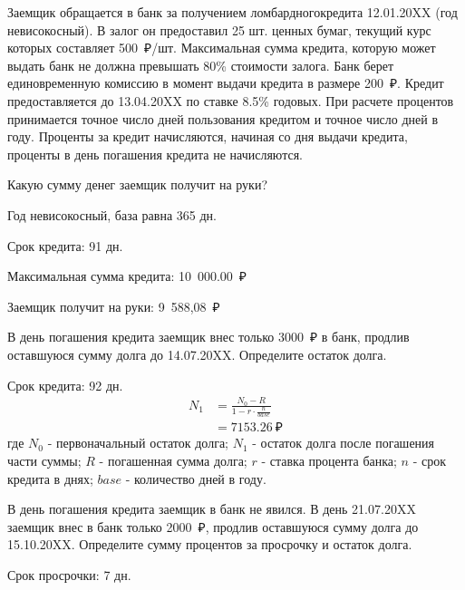 \documentclass[12pt, table]{exam}
\begin{document}
\begin{questions}
\begin{subparts}
\begin{solution}[12em]
	\end{solution}
	
\end{subparts}
\addpoints

\pagebreak
\question[15] Заемщик обращается в банк за получением ломбардного\linebreak кредита 12.01.20XX (год невисокосный). В залог он предоставил 25 шт. ценных бумаг, текущий курс которых составляет 500~₽/шт. Максимальная сумма кредита, которую может выдать банк не должна превышать 80\% стоимости залога. Банк берет единовременную комиссию в момент выдачи кредита в размере 200~₽. Кредит предоставляется до 13.04.20XX по ставке 8.5\% годовых. При расчете процентов принимается точное число дней пользования кредитом и точное число дней в году. Проценты за кредит начисляются, начиная со дня выдачи кредита, проценты в день погашения кредита не начисляются. 
\noaddpoints
\begin{subparts}
	\subpart[5]Какую сумму денег заемщик получит на руки?
	\begin{solution}[12em]
		
		Год невисокосный, база равна 365 дн. 
		
		Срок кредита: 91 дн.
		
		Максимальная сумма кредита: 10~000.00~₽
		
		Заемщик получит на руки: 9~588,08~₽
		
	\end{solution}
	
	\subpart[5] В день погашения кредита заемщик внес только 3000~₽ в банк, продлив оставшуюся сумму долга до 14.07.20XX.  Определите остаток долга.
	\begin{solution}[12em]
		\begin{multicols}{2}
		\setlength{\columnsep}{1cm}
		Срок кредита: 92 дн.
		\begin{align}
		N_1&=\frac{N_0-R}{1-r \cdot \frac{n}{base}}\\
		&=7153.26~₽\nonumber
		\end{align}
		где $N_0$ - первоначальный остаток долга; $N_1$ - остаток долга после погашения части суммы; $R$ - погашенная сумма долга; $r$ - ставка процента банка; $n$ - срок кредита в днях; $base$ - количество дней в году.
		\end{multicols}
	\end{solution}
	
	\subpart[5] В день погашения кредита заемщик в банк не явился. В день 21.07.20XX заемщик внес в банк только 2000~₽, продлив оставшуюся сумму долга до 15.10.20XX.  Определите сумму процентов за просрочку и остаток долга.
	\begin{solution}[6em]
		Срок просрочки: 7 дн.
		

\end{solution}
\end{subparts}
\end{questions}
\end{document}
